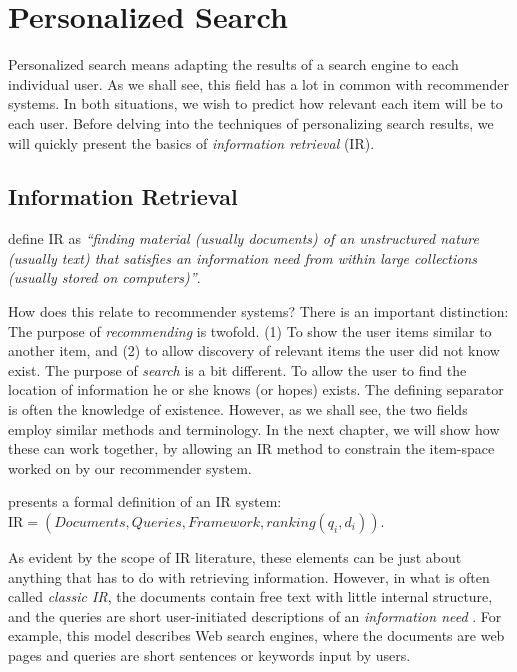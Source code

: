 \section{Personalized Search}
\label{sec:search}

Personalized search means adapting the results of a search engine to each individual user.
As we shall see, this field has a lot in common with recommender systems.
In both situations, we wish to predict how relevant each item will be to each user.
Before delving into the techniques of personalizing search results, we will quickly present 
the basics of \emph{information retrieval} (IR).

\subsection{Information Retrieval}
\label{sec:ir}

\citet[p1]{Manning2008} define IR as \emph{``finding material (usually documents) of
an unstructured nature (usually text) that satisfies an information need
from within large collections (usually stored on computers)''}.

How does this relate to recommender systems? There is an important distinction:
The purpose of \emph{recommending} is twofold. (1) To show the user items
similar to another item, and (2) to allow discovery of relevant items the user did not know exist.
The purpose of \emph{search} is a bit different. To allow the user to find the location of
information he or she knows (or hopes) exists.
The defining separator is often the knowledge of existence.
However, as we shall see, the two fields employ similar methods and terminology. 
In the next chapter, we will show how these can work together,
by allowing an IR method to constrain the item-space worked on by our recommender system.

\citet[p23]{Baeza-Yates1999} presents a formal definition of an IR system:
$\mathrm{IR} = (Documents, Queries, Framework, ranking(q_i, d_i))$.

As evident by the scope of IR literature, these elements can be just about anything
that has to do with retrieving information. However, in what is often called
\emph{classic IR}, the documents contain free text with little internal structure,
and the queries are short user-initiated descriptions of an \emph{information need} \citep[p19]{Baeza-Yates1999}. 
For example, this model describes Web search engines, where the documents are web pages and
queries are short sentences or keywords input by users.

